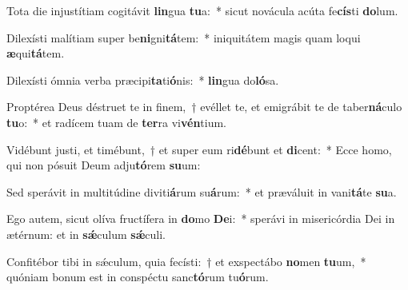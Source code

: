 \item Tota die injustítiam cogitávit \textbf{lin}gua \textbf{tu}a:~* sicut novácula acúta fe\textbf{cís}ti \textbf{do}lum.
\item Dilexísti malítiam super be\textbf{ni}gni\textbf{tá}tem:~* iniquitátem magis quam loqui \textbf{æ}qui\textbf{tá}tem.
\item Dilexísti ómnia verba præcipi\textbf{ta}ti\textbf{ó}nis:~* \textbf{lin}gua do\textbf{ló}sa.
\item Proptérea Deus déstruet te in finem,~† evéllet te, et emigrábit te de taber\textbf{ná}culo \textbf{tu}o:~* et radícem tuam de \textbf{ter}ra vi\textbf{vén}tium.
\item Vidébunt justi, et timébunt,~† et super eum ri\textbf{dé}bunt et \textbf{di}cent:~* Ecce homo, qui non pósuit Deum adju\textbf{tó}rem \textbf{su}um:
\item Sed sperávit in multitúdine diviti\textbf{á}rum su\textbf{á}rum:~* et præváluit in vani\textbf{tá}te \textbf{su}a.
\item Ego autem, sicut olíva fructífera in \textbf{do}mo \textbf{De}i:~* sperávi in misericórdia Dei in ætérnum: et in \textbf{sǽ}culum \textbf{sǽ}culi.
\item Confitébor tibi in sǽculum, quia fecísti:~† et exspectábo \textbf{no}men \textbf{tu}um,~* quóniam bonum est in conspéctu sanc\textbf{tó}rum tu\textbf{ó}rum.
